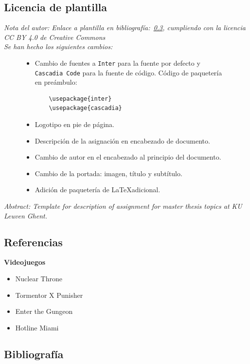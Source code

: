 \documentclass[12pt]{article}
\begin{document}
\begin{itemize}
    \subsection{Licencia de plantilla}
        \textit{Nota del autor: Enlace a plantilla en bibliografía:~\ref{bibliografia}, cumpliendo con la licencia CC BY 4.0 de Creative Commons}\\
        \textit{Se han hecho los siguientes cambios:}
        \begin{figure}[H]
            \begin{itemize}
                \item Cambio de fuentes a \texttt{Inter} para la fuente por defecto y \texttt{Cascadia Code} para la fuente de código.
                Código de paquetería en preámbulo:
\begin{verbatim}
    \usepackage{inter}
    \usepackage{cascadia}
\end{verbatim}
                \item Logotipo en pie de página.
                \item Descripción de la asignación en encabezado de documento.
                \item Cambio de autor en el encabezado al principio del documento.
                \item Cambio de la portada: imagen, título y subtítulo.
                \item Adición de paquetería de \LaTeX adicional. 
            \end{itemize}
        \end{figure}
        \textit{Abstract: Template for description of assignment for master thesis topics at KU Leuven Ghent.}
        \end{itemize}
    \subsection{Referencias}
    
    \textbf{Videojuegos}
    \begin{itemize}
        \item Nuclear Throne \cite{vlaamber}
        \item Tormentor X Punisher \cite{E-Studio}
        \item Enter the Gungeon \cite{ETG}
        \item Hotline Miami \cite{dennaton}
    \end{itemize}

    \newpage
    \subsection{Bibliografía} \label{bibliografia}
        \printbibliography[heading = none]
        \nocite{*}
\end{document}
